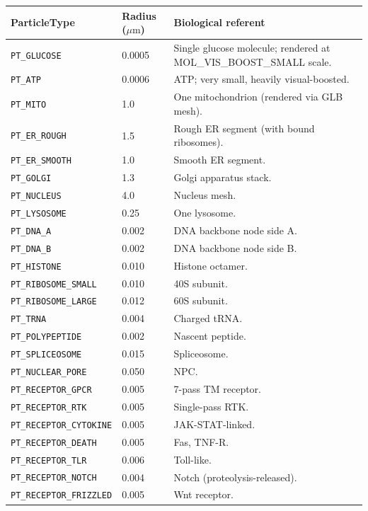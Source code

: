 \documentclass[11pt,letterpaper,twoside,openany]{book}
\newcommand{\code}[1]{\texttt{#1}}
\newcommand{\um}{\ensuremath{\mu\text{m}}}
\begin{document}
\begin{longtable}{p{4.5cm}p{1.5cm}p{8.0cm}}
\toprule
\textbf{ParticleType} & \textbf{Radius (\um)} & \textbf{Biological referent}\\ \midrule
\code{PT\_GLUCOSE}        & 0.0005 & Single glucose molecule; rendered at MOL\_VIS\_BOOST\_SMALL scale.\\
\code{PT\_ATP}            & 0.0006 & ATP; very small, heavily visual-boosted.\\
\code{PT\_MITO}           & 1.0    & One mitochondrion (rendered via GLB mesh).\\
\code{PT\_ER\_ROUGH}      & 1.5    & Rough ER segment (with bound ribosomes).\\
\code{PT\_ER\_SMOOTH}     & 1.0    & Smooth ER segment.\\
\code{PT\_GOLGI}          & 1.3    & Golgi apparatus stack.\\
\code{PT\_NUCLEUS}        & 4.0    & Nucleus mesh.\\
\code{PT\_LYSOSOME}       & 0.25   & One lysosome.\\
\code{PT\_DNA\_A}         & 0.002  & DNA backbone node side A.\\
\code{PT\_DNA\_B}         & 0.002  & DNA backbone node side B.\\
\code{PT\_HISTONE}        & 0.010  & Histone octamer.\\
\code{PT\_RIBOSOME\_SMALL}& 0.010  & 40S subunit.\\
\code{PT\_RIBOSOME\_LARGE}& 0.012  & 60S subunit.\\
\code{PT\_TRNA}           & 0.004  & Charged tRNA.\\
\code{PT\_POLYPEPTIDE}    & 0.002  & Nascent peptide.\\
\code{PT\_SPLICEOSOME}    & 0.015  & Spliceosome.\\
\code{PT\_NUCLEAR\_PORE}  & 0.050  & NPC.\\
\code{PT\_RECEPTOR\_GPCR} & 0.005  & 7-pass TM receptor.\\
\code{PT\_RECEPTOR\_RTK}  & 0.005  & Single-pass RTK.\\
\code{PT\_RECEPTOR\_CYTOKINE} & 0.005 & JAK-STAT-linked.\\
\code{PT\_RECEPTOR\_DEATH} & 0.005 & Fas, TNF-R.\\
\code{PT\_RECEPTOR\_TLR}   & 0.006 & Toll-like.\\
\code{PT\_RECEPTOR\_NOTCH} & 0.004 & Notch (proteolysis-released).\\
\code{PT\_RECEPTOR\_FRIZZLED} & 0.005 & Wnt receptor.\\

\end{longtable}
\end{document}
